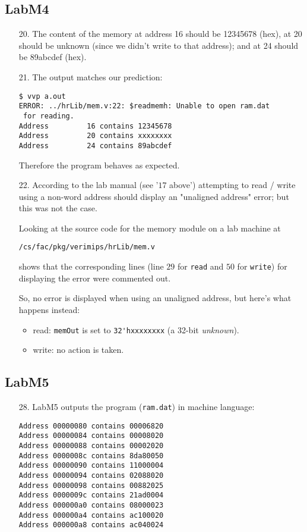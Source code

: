 \documentclass{article}
\begin{document}
\subsection{LabM4}
\begin{enumerate}
\item[20. ] The content of the memory at address 16 should be 12345678 (hex),
at 20 should be unknown (since we didn't write to that address);
and at 24 should be 89abcdef (hex).

\item[21. ] The output matches our prediction:
\begin{verbatim}
$ vvp a.out
ERROR: ../hrLib/mem.v:22: $readmemh: Unable to open ram.dat
 for reading.
Address         16 contains 12345678
Address         20 contains xxxxxxxx
Address         24 contains 89abcdef
\end{verbatim}
  Therefore the program behaves as expected.

\item[22. ] According to the lab manual (see '$17$ above') attempting to
read / write using a non-word address should display an "unaligned address"
error; but this was not the case. \newline

Looking at the source code for the memory module on a lab machine at
\begin{verbatim}
/cs/fac/pkg/verimips/hrLib/mem.v
\end{verbatim}
shows that the corresponding lines (line $29$ for \verb$read$ and
$50$ for \verb$write$) for displaying the error were commented out. \newline

So, no error is displayed when using an unaligned address, but here's what
happens instead:

\begin{itemize}
\item read: \verb$memOut$ is set to \verb$32'hxxxxxxxx$ (a 32-bit \textit{unknown}).
\item write: no action is taken.
\end{itemize}
\end{enumerate}

\subsection{LabM5}
\begin{enumerate}
\item[28. ] LabM5 outputs the program (\verb$ram.dat$) in machine language:
\begin{verbatim}
Address 00000080 contains 00006820
Address 00000084 contains 00008020
Address 00000088 contains 00002020
Address 0000008c contains 8da80050
Address 00000090 contains 11000004
Address 00000094 contains 02088020
Address 00000098 contains 00882025
Address 0000009c contains 21ad0004
Address 000000a0 contains 08000023
Address 000000a4 contains ac100020
Address 000000a8 contains ac040024
\end{verbatim}
\end{enumerate}
\end{document}
